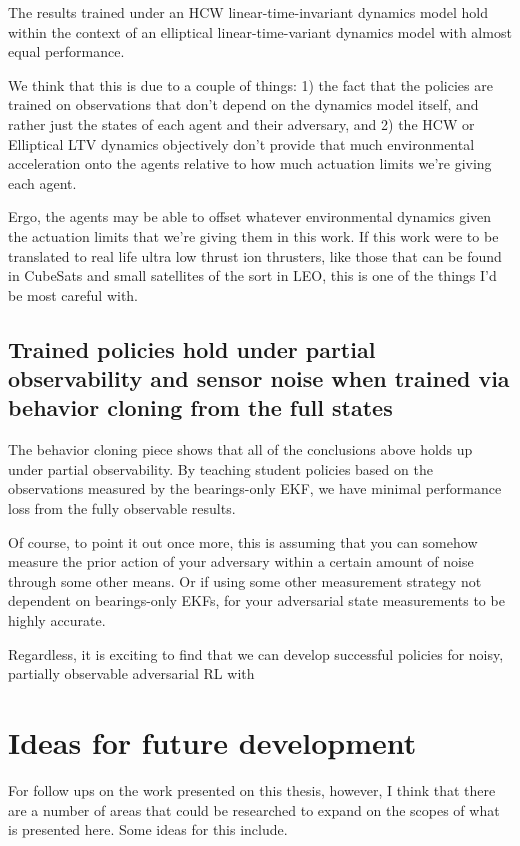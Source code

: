 The results trained under an HCW linear-time-invariant dynamics model hold within the context of an elliptical linear-time-variant dynamics model with almost equal performance. 

We think that this is due to a couple of things: 1) the fact that the policies are trained on observations that don't depend on the dynamics model itself, and rather just the states of each agent and their adversary, and 2) the HCW or Elliptical LTV dynamics objectively don't provide that much environmental acceleration onto the agents relative to how much actuation limits we're giving each agent.

Ergo, the agents may be able to offset whatever environmental dynamics given the actuation limits that we're giving them in this work. If this work were to be translated to real life ultra low thrust ion thrusters, like those that can be found in CubeSats and small satellites of the sort in LEO, this is one of the things I'd be most careful with.


\subsection*{Trained policies hold under partial observability and sensor noise when trained via behavior cloning from the full states}

The behavior cloning piece shows that all of the conclusions above holds up under partial observability. By teaching student policies based on the observations measured by the bearings-only EKF, we have minimal performance loss from the fully observable results. 

Of course, to point it out once more, this is assuming that you can somehow measure the prior action of your adversary within a certain amount of noise through some other means. Or if using some other measurement strategy not dependent on bearings-only EKFs, for your adversarial state measurements to be highly accurate.


Regardless, it is exciting to find that we can develop successful policies for noisy, partially observable adversarial RL with 


\section{Ideas for future development}

For follow ups on the work presented on this thesis, however, I think that there are a number of areas that could be  researched to expand on the scopes of what is presented here. Some ideas for this include.

